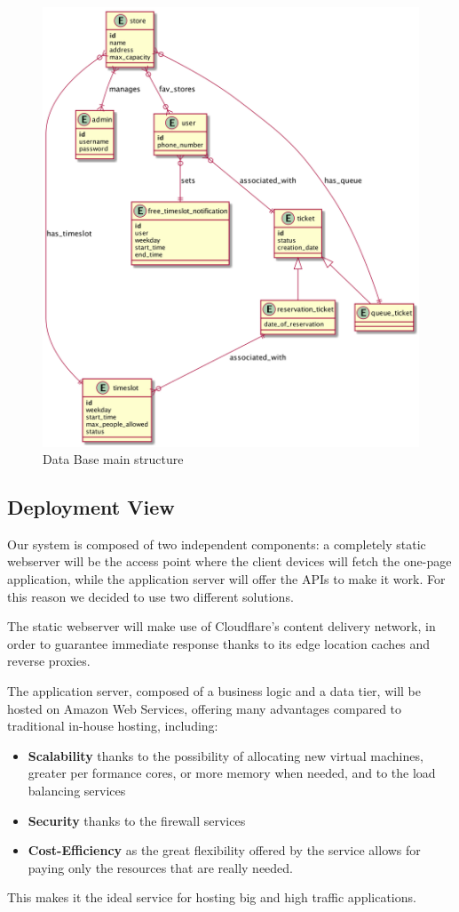 \begin{figure}[H]
    \includegraphics[width=\linewidth]{uml/db_structure.png}
    \caption{Data Base main structure}
    \label{fig:db_structure}
\end{figure}




\subsection{Deployment View}
Our system is composed of two independent components: a completely static webserver will be the access point where the client devices will fetch the one-page application, while the application server will offer the APIs to make it work.
For this reason we decided to use two different solutions.

The static webserver will make use of Cloudflare's content delivery network, in order to guarantee immediate response thanks to its edge location caches and reverse proxies.

The application server, composed of a business logic and a data tier, will be hosted on Amazon Web Services, offering many advantages compared to traditional in-house hosting, including:
\begin{itemize}
    \item \textbf{Scalability} thanks to the possibility of allocating new virtual machines, greater per formance cores, or more memory when needed, and to the load balancing services
    \item \textbf{Security} thanks to the firewall services
    \item \textbf{Cost-Efficiency} as the great flexibility offered by the service allows for paying only the resources that are really needed.
\end{itemize}
This makes it the ideal service for hosting big and high traffic applications.

